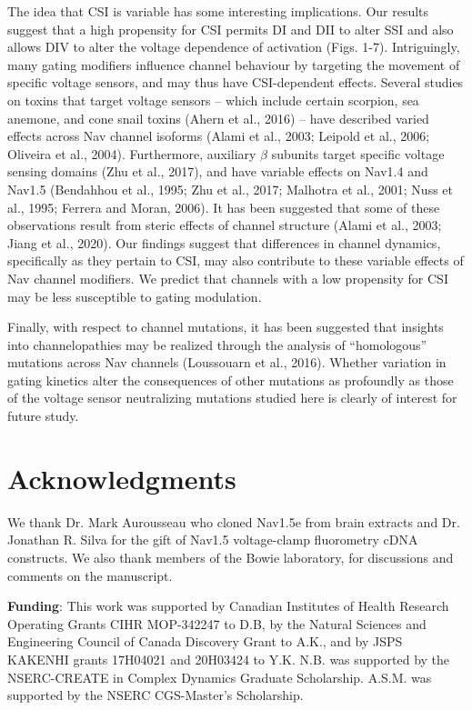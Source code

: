 The idea that CSI is variable has some interesting implications. Our results suggest that a high propensity for CSI permits DI and DII to alter SSI and also allows DIV to alter the voltage dependence of activation (Figs. 1-7). Intriguingly, many gating modifiers influence channel behaviour by targeting the movement of specific voltage sensors, and may thus have CSI-dependent effects. Several studies on toxins that target voltage sensors – which include certain scorpion, sea anemone, and cone snail toxins (Ahern et al., 2016) – have described varied effects across Nav channel isoforms (Alami et al., 2003; Leipold et al., 2006; Oliveira et al., 2004). Furthermore, auxiliary $\beta$ subunits target specific voltage sensing domains (Zhu et al., 2017), and have variable effects on Nav1.4 and Nav1.5 (Bendahhou et al., 1995; Zhu et al., 2017; Malhotra et al., 2001; Nuss et al., 1995; Ferrera and Moran, 2006). It has been suggested that some of these observations result from steric effects of channel structure (Alami et al., 2003; Jiang et al., 2020). Our findings suggest that differences in channel dynamics, specifically as they pertain to CSI, may also contribute to these variable effects of Nav channel modifiers. We predict that channels with a low propensity for CSI may be less susceptible to gating modulation. 

Finally, with respect to channel mutations, it has been suggested that insights into channelopathies may be realized through the analysis of “homologous” mutations across Nav channels (Loussouarn et al., 2016). Whether variation in gating kinetics alter the consequences of other mutations as profoundly as those of the voltage sensor neutralizing mutations studied here is clearly of interest for future study.

\section{Acknowledgments}

We thank Dr. Mark Aurousseau who cloned Nav1.5e from brain extracts and Dr. Jonathan R. Silva for the gift of Nav1.5 voltage-clamp fluorometry cDNA constructs. We also thank members of the Bowie laboratory, for discussions and comments on the manuscript.

\noindent \textbf{Funding}: This work was supported by Canadian Institutes of Health Research Operating Grants CIHR MOP-342247 to D.B, by the Natural Sciences and Engineering Council of Canada Discovery Grant to A.K., and by JSPS KAKENHI grants 17H04021 and 20H03424 to Y.K. N.B. was supported by the NSERC-CREATE in Complex Dynamics Graduate Scholarship. A.S.M. was supported by the NSERC CGS-Master’s Scholarship. 

